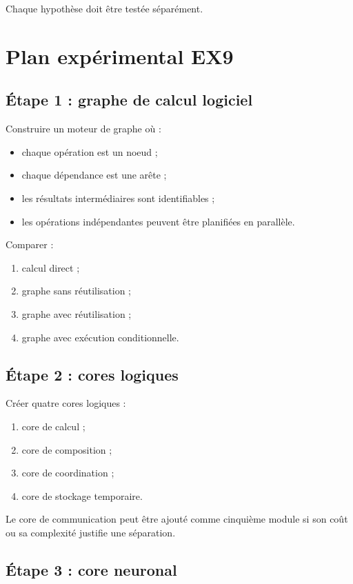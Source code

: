 \documentclass[11pt,a4paper]{article}
\begin{document}
Chaque hypothèse doit être testée séparément.

\section{Plan expérimental EX9}

\subsection{Étape 1 : graphe de calcul logiciel}

Construire un moteur de graphe où :
\begin{itemize}
  \item chaque opération est un noeud ;
  \item chaque dépendance est une arête ;
  \item les résultats intermédiaires sont identifiables ;
  \item les opérations indépendantes peuvent être planifiées en parallèle.
\end{itemize}

Comparer :
\begin{enumerate}
  \item calcul direct ;
  \item graphe sans réutilisation ;
  \item graphe avec réutilisation ;
  \item graphe avec exécution conditionnelle.
\end{enumerate}

\subsection{Étape 2 : cores logiques}

Créer quatre cores logiques :
\begin{enumerate}
  \item core de calcul ;
  \item core de composition ;
  \item core de coordination ;
  \item core de stockage temporaire.
\end{enumerate}

Le core de communication peut être ajouté comme cinquième module
si son coût ou sa complexité justifie une séparation.

\subsection{Étape 3 : core neuronal}
\end{document}
